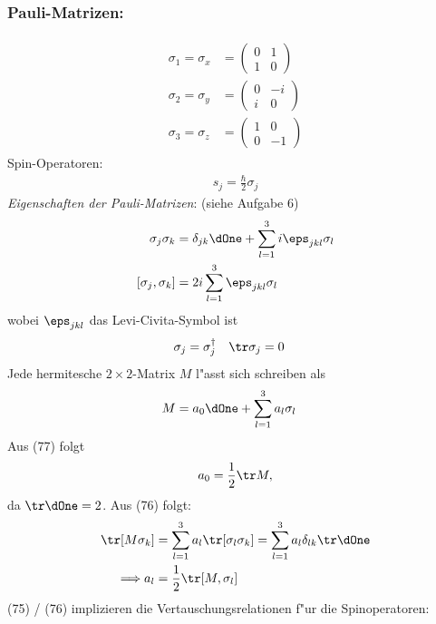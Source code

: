 \documentclass[a4paper]{scrartcl}
\begin{document}
{\subsubsection*{Pauli-Matrizen:}
\begin{align}
\begin{split}
\sigma_1 = \sigma_x & = \begin{pmatrix} 0 & 1 \\ 1& 0 \end{pmatrix} \\
\sigma_2 = \sigma_y & = \begin{pmatrix} 0 & -i \\ i & 0 \end{pmatrix} \\
\sigma_3 = \sigma_z & = \begin{pmatrix} 1 & 0 \\ 0& -1 \end{pmatrix}
\end{split}
\end{align}
Spin-Operatoren:
\begin{align}
s_j = \frac \hbar 2 \sigma_j
\end{align}
\emph{Eigenschaften der Pauli-Matrizen}: (siehe Aufgabe 6)
\begin{align}
\begin{split}
\sigma_j \sigma_k & = \delta_{jk} \dOne + \sum_{l=1}^3 i \eps_{jkl} \sigma_l \\
[\sigma_j, \sigma_k] & = 2i \sum_{l=1}^3 \eps_{jkl} \sigma_l
\end{split}
\end{align}
wobei $\eps_{jkl}$ das Levi-Civita-Symbol ist
\begin{align}
\sigma_j &  = \sigma_j^\dagger &  \tr \sigma_j & = 0
\end{align}
Jede hermitesche $2 \times 2$-Matrix $M$ l"asst sich schreiben als
\begin{align}
M & = a_0 \dOne + \sum_{l=1}^3 a_l \sigma_l
\end{align}
Aus (77) folgt
\begin{align}
a_0 = \frac12 \tr M, 
\end{align}
da $\tr \dOne = 2$. Aus (76) folgt:
\begin{align}
\tr [ M \sigma_k] & = \sum_{l=1}^3 a_l \tr [\sigma_l \sigma_k]  = \sum_{l=1}^3 a_l \delta_{lk} \tr \dOne \notag \\
\Longrightarrow a_l & = \frac12 \tr[M, \sigma_l]
\end{align}
(75) / (76) implizieren die Vertauschungsrelationen f"ur die Spinoperatoren:
}
\end{document}
